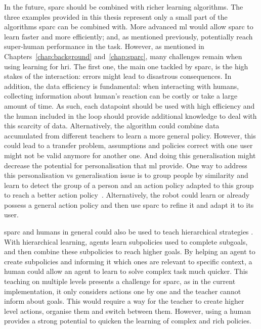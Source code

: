 In the future, \gls{sparc} should be combined with richer learning algorithms. The three examples provided in this thesis represent only a small part of the algorithms \gls{sparc} can be combined with. More advanced \gls{ml} would allow \gls{sparc} to learn faster and more efficiently; and, as mentioned previously, potentially reach super-human performance in the task. However, as mentioned in Chapters~\ref{chap:background} and~\ref{chap:sparc}, many challenges remain when using learning for \gls{hri}. The first one, the main one tackled by \gls{sparc}, is the high stakes of the interaction: errors might lead to disastrous consequences. In addition, the data efficiency is fundamental: when interacting with humans, collecting information about human's reaction can be costly or take a large amount of time. As such, each datapoint should be used with high efficiency and the human included in the loop should provide additional knowledge to deal with this scarcity of data. Alternatively, the algorithm could combine data accumulated from different teachers to learn a more general policy. However, this could lead to a transfer problem, assumptions and policies correct with one user might not be valid anymore for another one. And doing this generalisation might decrease the potential for personalisation that \gls{ml} provide. One way to address this personalisation vs generalisation issue is to group people by similarity and learn to detect the group of a person and an action policy adapted to this group to reach a better action policy~\citep{brunskill2014pac}. Alternatively, the robot could learn or already possess a general action policy and then use \gls{sparc} to refine it and adapt it to its user. 

\gls{sparc} and humans in general could also be used to teach hierarchical strategies \citep{botvinick2012hierarchical}. With hierarchical learning, agents learn subpolicies used to complete subgoals, and then combine these subpolicies to reach higher goals. By helping an agent to create subpolicies and informing it which ones are relevant to specific context, a human could allow an agent to learn to solve complex task much quicker. This teaching on multiple levels presents a challenge for \gls{sparc}, as in the current implementation, it only considers actions one by one and the teacher cannot inform about goals. This would require a way for the teacher to create higher level actions, organise them and switch between them. However, using a human provides a strong potential to quicken the learning of complex and rich policies.

